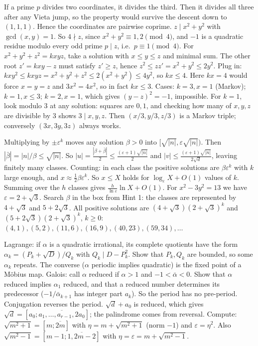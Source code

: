 \documentclass[11pt,a4paper]{article}
\begin{document}
 If a prime $p$ divides two coordinates, it divides the third. Then it divides all three after any Vieta jump, so the property would survive the descent down to $(1,1,1)$. Hence the coordinates are pairwise coprime.
 $z\mid x^2+y^2$ with $\gcd(x,y)=1$. So $4\nmid z$, since $x^2+y^2\equiv1,2\pmod4$, and $-1$ is a quadratic residue modulo every odd prime $p\mid z$, i.e.\ $p\equiv1\pmod4$.
 For $x^2+y^2+z^2=kxyz$, take a solution with $x\le y\le z$ and minimal sum. The other root $z'=kxy-z$ must satisfy $z'\ge z$, hence $z^2\le zz'=x^2+y^2\le 2y^2$. Plug in: $kxy^2\le kxyz=x^2+y^2+z^2\le2(x^2+y^2)\le4y^2$, so $kx\le4$. Here $kx=4$ would force $x=y=z$ and $3x^2=4x^2$, so in fact $kx\le3$.
 Cases: $k=3,x=1$ (Markov); $k=1,x\le3$; $k=2,x=1$, which gives $(y-z)^2=-1$, impossible. For $k=1$, look modulo $3$ at any solution: squares are $0,1$, and checking how many of $x,y,z$ are divisible by $3$ shows $3\mid x,y,z$. Then $(x/3,y/3,z/3)$ is a Markov triple; conversely $(3x,3y,3z)$ always works.

 Multiplying by $\pm\varepsilon^{k}$ moves any solution $\beta>0$ into $[\sqrt{|n|},\varepsilon\sqrt{|n|})$. Then $|\bar\beta|=|n|/\beta\le\sqrt{|n|}$. So $|u|=\frac{|\beta+\bar\beta|}2\le\frac{(\varepsilon+1)\sqrt{|n|}}2$ and $|v|\le\frac{(\varepsilon+1)\sqrt{|n|}}{2\sqrt d}$, leaving finitely many classes.
 Counting: in each class the positive solutions are $\beta\varepsilon^k$ with $k$ large enough, and $x\approx\frac12\beta\varepsilon^k$. So $x\le X$ holds for $\log_\varepsilon X+O(1)$ values of $k$. Summing over the $h$ classes gives $\frac h{\ln\varepsilon}\ln X+O(1)$.
 For $x^2-3y^2=13$ we have $\varepsilon=2+\sqrt3$. Search $\beta$ in the box from Hint 1: the classes are represented by $4+\sqrt3$ and $5+2\sqrt3$. All positive solutions are $(4+\sqrt3)(2+\sqrt3)^k$ and $(5+2\sqrt3)(2+\sqrt3)^k$, $k\ge0$: $(4,1),(5,2),(11,6),(16,9),(40,23),(59,34),\dots$

 Lagrange: if $\alpha$ is a quadratic irrational, its complete quotients have the form $\alpha_k=(P_k+\sqrt D)/Q_k$ with $Q_k\mid D-P_k^2$. Show that $P_k,Q_k$ are bounded, so some $\alpha_k$ repeats. The converse ($\alpha$ periodic implies quadratic) is the fixed point of a M\"obius map.
 Galois: call $\alpha$ reduced if $\alpha>1$ and $-1<\bar\alpha<0$. Show that $\alpha$ reduced implies $\alpha_1$ reduced, and that a reduced number determines its predecessor ($-1/\bar\alpha_{k+1}$ has integer part $a_k$). So the period has no pre-period. Conjugation reverses the period.
 $\sqrt d+a_0$ is reduced, which gives $\sqrt d=[a_0;\overline{a_1,\dots,a_{r-1},2a_0}]$; the palindrome comes from reversal. Compute: $\sqrt{m^2+1}=[m;\overline{2m}]$ with $\eta=m+\sqrt{m^2+1}$ (norm $-1$) and $\varepsilon=\eta^2$. Also $\sqrt{m^2-1}=[m-1;\overline{1,2m-2}]$ with $\eta=\varepsilon=m+\sqrt{m^2-1}$.
\end{document}
